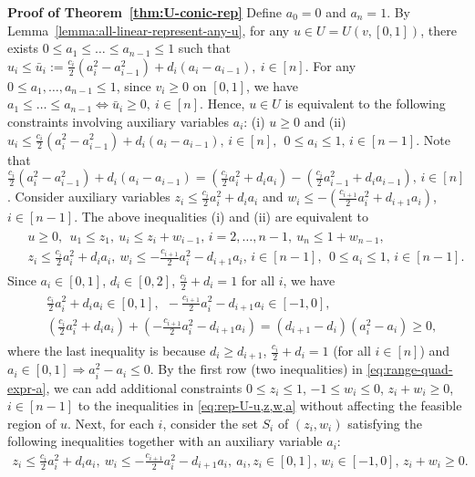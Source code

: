 	\smallskip\noindent\textbf{Proof of Theorem~\ref{thm:U-conic-rep}}
		Define $a_0 = 0$ and $a_n = 1$. By Lemma~\ref{lemma:all-linear-represent-any-u}, for any $u\in U = U(v, [0,1])$, there exists $0\leq a_1 \leq \dots \leq a_{n-1}\leq 1$ such that 
		$u_i \leq \bar{u}_i := \frac{c_i}{2}(a_i^2 - a_{i-1}^2) + d_i (a_i - a_{i-1}),\ i\in [n]$. 
	For any $0\leq a_1, \dots, a_{n-1}\leq 1$, since $v_i \geq 0$ on $[0,1]$, we have 
	$ a_1 \leq \dots \leq a_{n-1} \Leftrightarrow \bar{u}_i \geq 0, \ i\in [n]$.
	Hence, $u\in U$ is equivalent to the following constraints involving auxiliary variables $a_i$: (i) $ u\geq 0$ and (ii) $u_i \leq \frac{c_i}{2}(a_i^2 - a_{i-1}^2) + d_i (a_i - a_{i-1}),\, i\in [n],\ \
		 0 \leq a_i \leq 1,\, i\in [n-1]$. 
	Note that $\frac{c_i}{2}(a_i^2 - a_{i-1}^2) + d_i(a_i - a_{i-1}) = \left(\frac{c_i}{2}a_i^2 + d_i a_i\right) - \left(\frac{c_i}{2}a_{i-1}^2 + d_i a_{i-1}\right),\, i\in [n]$.
	Consider auxiliary variables $z_i\leq \frac{c_i}{2}a_i^2 + d_i a_i$ and $w_i \leq - (\frac{c_{i+1}}{2}a_i^2 + d_{i+1} a_i)$, $i\in [n-1]$. The above inequalities (i) and (ii) are equivalent to 
	\begin{align}
		\begin{split}
			& u\geq 0, \ \ u_1 \leq z_1, \  u_i \leq z_i + w_{i-1},\, i=2, \dots, n-1, \  u_n \leq 1+w_{n-1},\\
			& z_i \leq \frac{c_i}{2} a_i^2 + d_i a_i,\ w_i \leq -\frac{c_{i+1}}{2} a_i^2 - d_{i+1}a_i, \, i \in [n-1], \ \ 0\leq a_i \leq 1,\, i\in [n-1]. 
		\end{split}\label{eq:rep-U-u,z,w,a}
	\end{align}
	Since $a_i \in [0,1]$, $d_i \in [0,2]$, $\frac{c_i}{2} + d_i = 1$ for all $i$, we have
	\begin{align}
		\begin{split}
			& \frac{c_i}{2}a_i^2 + d_i a_i \in [0,1],\ \ -\frac{c_{i+1}}{2}a_i^2 - d_{i+1} a_i \in [-1,0],\\
			& \left(\frac{c_i}{2}a_i^2 + d_i a_i \right) + \left(-\frac{c_{i+1}}{2}a_i^2 - d_{i+1} a_i\right) = (d_{i+1} - d_i)(a_i^2 - a_i) \geq 0, 
		\end{split} \label{eq:range-quad-expr-a}
	\end{align}
	where the last inequality is because $d_i \geq d_{i+1}$, $\frac{c_i}{2} + d_i = 1$ (for all $i\in [n]$) and $a_i \in [0,1] \Rightarrow a_i^2 - a_i \leq 0$.
	By the first row (two inequalities) in \eqref{eq:range-quad-expr-a}, we can add additional constraints 
	$0\leq z_i \leq 1$, $-1 \leq w_i\leq 0$, $z_i + w_i \geq 0$, $i\in [n-1]$
	to the inequalities in \eqref{eq:rep-U-u,z,w,a} without affecting the feasible region of $u$. 
	Next, for each $i$, consider the set $S_i$ of $(z_i, w_i)$ satisfying the following inequalities together with an auxiliary variable $a_i$:
	\begin{align}
		z_i \leq \tfrac{c_i}{2}a_i^2 + d_i a_i, \
		w_i \leq - \tfrac{c_{i+1}}{2} a_i^2 - d_{i+1} a_i,\ 
		a_i, z_i \in [0,1], \, w_i\in [-1,0],\, z_i + w_i \geq 0. \label{eq:zi-wi-ai-zi+wi>=0}
	\end{align}
	

